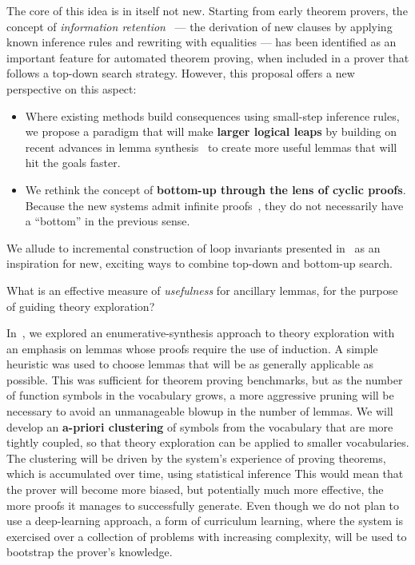 The core of this idea is in itself not new.
Starting from early theorem provers, the concept of \emph{information retention}~\cite{JAR1995:Voronkov} --- the derivation of new clauses by applying known inference rules and rewriting with equalities --- has been identified as an important feature for automated theorem proving, \esp when included in a prover that follows a top-down search strategy.
However, this proposal offers a new perspective on this aspect:
\begin{itemize}
  \item Where existing methods build consequences using small-step inference rules, we propose a paradigm that will make \textbf{larger logical leaps} by building on recent advances in lemma synthesis~\cite{moa,thesy,CAV2021:Murali} to create more useful lemmas that will hit the goals faster.
  \item We rethink the concept of \textbf{bottom-up through the lens of cyclic proofs}.
  Because the new systems admit infinite proofs~\cite{LICS2007:Brotherston,more}, they do not necessarily have a ``bottom'' in the previous sense.
\end{itemize}

We allude to incremental construction of loop invariants presented in~\cite{arXiv2020:Padon,FAC2008:Bradley} as an inspiration for new, exciting ways to combine top-down and bottom-up search.


\begin{researchquestion}
What is an effective measure of \emph{usefulness} for ancillary lemmas, for the purpose of guiding theory exploration?
\end{researchquestion}

In~\cite{thesy}, we explored an enumerative-synthesis approach to theory exploration with an emphasis on lemmas whose proofs require the use of induction.
A simple heuristic was used to choose lemmas that will be as generally applicable as possible.
This was sufficient for theorem proving benchmarks, but as the number of function symbols in the vocabulary grows, a more aggressive pruning will be necessary to avoid an unmanageable blowup in the number of lemmas.
We will develop an \textbf{a-priori clustering} of symbols from the vocabulary that are more tightly coupled, so that theory exploration can be applied to smaller vocabularies.
The clustering will be driven by the system's experience of proving theorems, which is accumulated over time, using statistical inference
This would mean that the prover will become more biased, but potentially much more effective, the more proofs it manages to successfully generate.
Even though we do not plan to use a deep-learning approach, a form of curriculum learning, where the system is exercised over a collection of problems with increasing complexity, will be used to bootstrap the prover's knowledge.
